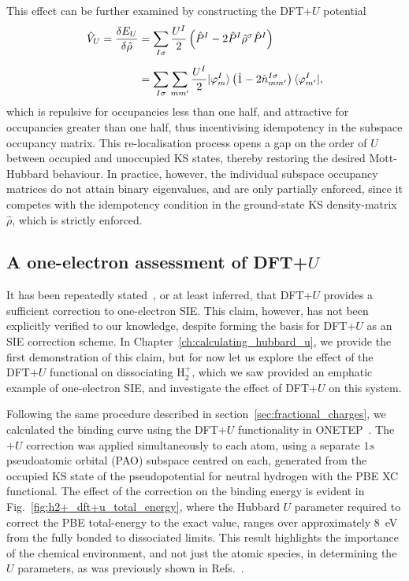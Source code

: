 {This effect can be further examined 
by constructing the DFT+$U$ potential 
%
\begin{align}
\hat{V}_U
=\frac{\delta E_U}{\delta\hat{\rho}}
&=\sum_{I\sigma}\frac{U^I}{2}\left(\hat{P}^I-2\hat{P}^I\hat{\rho}^\sigma\hat{P}^I\right)\nonumber \\[0.5em]
&=\sum_{I\sigma}\sum_{mm'}\frac{U^I}{2}\vert\varphi^I_m\rangle\left(\hat{1}-2\hat{n}^{I\sigma}_{mm'}\right)\langle\varphi^I_{m'}\vert, 
\end{align}
%
which is repulsive for occupancies 
less than one half, 
and attractive for occupancies 
greater than one half, 
thus incentivising idempotency 
in the subspace occupancy matrix.
% 
This re-localisation process opens a gap 
on the order of $U$
between occupied and unoccupied 
KS states, 
thereby restoring the desired 
Mott-Hubbard behaviour.
%
In practice, however,  
the individual subspace occupancy matrices 
do not attain binary eigenvalues, 
and are only partially enforced, 
since it competes with the idempotency condition 
in the ground-state KS density-matrix $\hat{\rho}$, 
which is strictly enforced.
%

\subsection{A one-electron assessment of DFT+$U$}
\label{sec:one_electron_dft+u}

{
It has been repeatedly stated~\cite{PhysRevB.44.943,PhysRevB.48.16929,PhysRevB.71.035105,PhysRevB.71.041102,PhysRevB.73.195107,PhysRevB.75.035115,:/content/aip/journal/jcp/145/5/10.1063/1.4959882,PhysRevLett.97.103001}, 
or at least inferred, 
that DFT+$U$ provides a sufficient 
correction to one-electron SIE.
%
This claim, however, 
has not been explicitly verified to our knowledge, 
despite forming the basis for DFT+$U$ 
as an SIE correction scheme.
%
In Chapter~\ref{ch:calculating_hubbard_u}, 
we provide the first demonstration of this claim, 
but for now let us explore the 
effect of the DFT+$U$ functional on dissociating  H$_2^+$, 
which we saw provided an emphatic example of one-electron SIE, 
and investigate the effect of DFT+$U$ on this system.}

Following the same procedure 
described in section~\ref{sec:fractional_charges}, 
we calculated the binding curve using the DFT+$U$ 
functionality in {\sc ONETEP}~\cite{PhysRevB.85.085107}.
%
The $+U$ correction 
was applied simultaneously to each atom,
using a separate $1s$ pseudoatomic orbital (PAO) subspace
centred on each, 
generated from the occupied KS state 
of the pseudopotential for neutral hydrogen 
{with the PBE XC functional}.
%
The effect of the correction on 
the binding energy 
is evident in Fig.~\ref{fig:h2+_dft+u_total_energy}, 
where the Hubbard $U$ parameter required to correct the
PBE total-energy to the exact value, 
ranges over approximately $8$~eV from the fully bonded to 
dissociated limits.
This result highlights the 
importance of the chemical environment, 
and not just the atomic species,
in determining the $U$ parameters, 
as was previously shown 
in Refs.~\cite{doi:10.1063/1.3660353,
doi:10.1063/1.4865831,PhysRevB.90.115105}.

}
